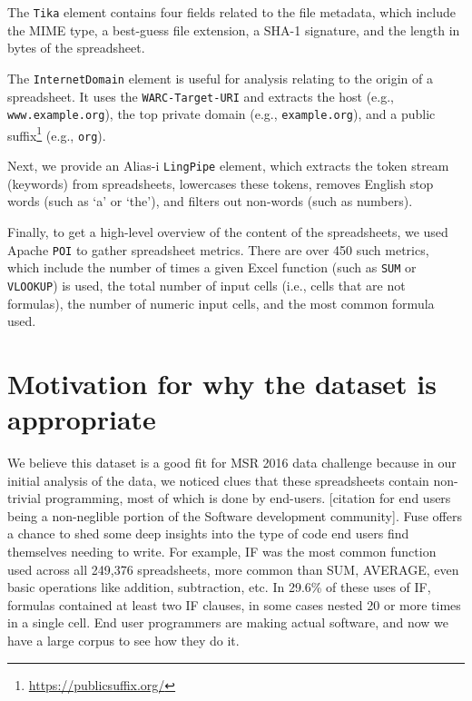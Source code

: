 \documentclass[conference]{IEEEtran}
\newcommand{\xlscount}{249,376}
\begin{document}
The \texttt{Tika} element contains four fields related to the file metadata, which include the MIME type, a best-guess file extension, a SHA-1 signature, and the length in bytes of the spreadsheet.

The \texttt{InternetDomain} element is useful for analysis relating to the origin of a spreadsheet. It uses the \texttt{WARC-Target-URI} and extracts the host (e.g., \texttt{www.example.org}), the top private domain (e.g., \texttt{example.org}), and a public suffix\footnote{\url{https://publicsuffix.org/}} (e.g., \texttt{org}).

Next, we provide an Alias-i \texttt{LingPipe} element, which extracts the token stream (keywords) from spreadsheets, lowercases these tokens, removes English stop words (such as `a' or `the'), and filters out non-words (such as numbers).

Finally, to get a high-level overview of the content of the spreadsheets, we used Apache \texttt{POI} to gather spreadsheet metrics. There are over 450 such metrics, which include the number of times a given Excel function (such as \texttt{SUM} or \texttt{VLOOKUP}) is used, the total number of input cells (i.e., cells that are not formulas), the number of numeric input cells, and the most common formula used. 




\section{Motivation for why the dataset is appropriate}

We believe this dataset is a good fit for MSR 2016 data challenge because in our initial analysis of the data, we noticed clues that these spreadsheets contain non-trivial programming, most of which is done by end-users.
[citation for end users being a non-neglible portion of the Software development community].  
Fuse offers a chance to shed some deep insights into the type of code end users find themselves needing to write.
For example, IF was the most common function used across all \xlscount{} spreadsheets, more common than SUM, AVERAGE, even basic operations like addition, subtraction, etc.
In 29.6\% of these uses of IF, formulas contained at least two IF clauses, in some cases nested 20 or more times in a single cell.
End user programmers are making actual software, and now we have a large corpus to see how they do it.
\end{document}
